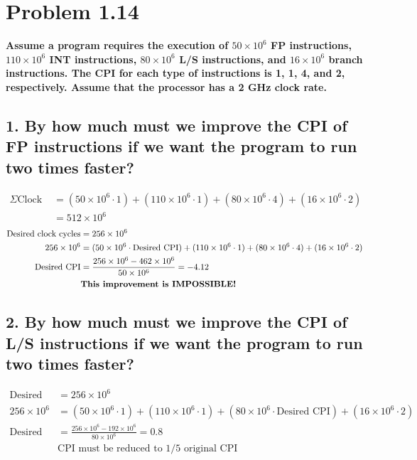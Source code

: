 \documentclass[11pt]{article}
\begin{document}
\section*{Problem 1.14}
\small\textbf{Assume a program requires the execution of $50 \times 10^6$ FP instructions, $110 \times 10^6$ INT instructions, $80 \times 10^6$ L/S instructions, and $16 \times 10^6$ branch instructions. The CPI for each type of instructions is 1, 1, 4, and 2, respectively. Assume that the processor has a 2 GHz clock rate.}

\subsection*{\small 1. By how much must we improve the CPI of FP instructions if we want the program to run two times faster?}
\begin{align*}
\Sigma \textrm{Clock Cycles} & = (50 \times 10^6 \cdot 1) + (110 \times 10^6 \cdot 1) + (80 \times 10^6 \cdot 4) + (16 \times 10^6 \cdot 2)\\
& = 512 \times 10^6
\end{align*}
\begin{align*}
\textrm{Desired clock cycles} & = 256 \times 10^6\\
256 \times 10^6 & = (50 \times 10^6 \cdot \textrm{Desired CPI}) + (110 \times 10^6 \cdot 1) + (80 \times 10^6 \cdot 4) + (16 \times 10^6 \cdot 2)\\
\textrm{Desired CPI} & = \frac{256 \times 10^6 - 462 \times 10^6}{50 \times 10^6} = {-4.12}\\
& \textbf{\textrm{This improvement is IMPOSSIBLE!}}
\end{align*}

\subsection*{\small 2. By how much must we improve the CPI of L/S instructions if we want the program to run two times faster?}
\begin{align*}
\textrm{Desired clock cycles} & = 256 \times 10^6\\
256 \times 10^6 & = (50 \times 10^6 \cdot 1) + (110 \times 10^6 \cdot 1) + (80 \times 10^6 \cdot \textrm{Desired CPI}) + (16 \times 10^6 \cdot 2)\\
\textrm{Desired CPI} & = \frac{256 \times 10^6 - 192 \times 10^6}{80 \times 10^6} = \boldsymbol{0.8}\\
& \textrm{CPI must be reduced to 1/5 original CPI}
\end{align*}
\end{document}
